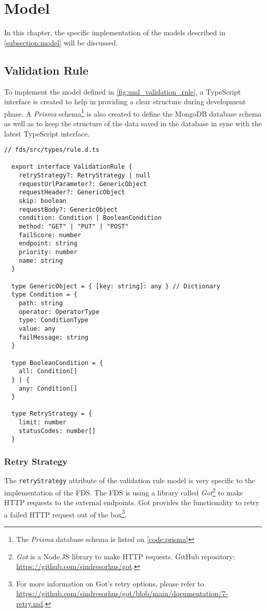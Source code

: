 \section{Model}

In this chapter, the specific implementation of the models described in \autoref{subsection:model} will be discussed. 

  \subsection{Validation Rule}
    To implement the model defined in \autoref{fig:uml_validation_rule}, a TypeScript interface is created to help in providing a clear structure during development phase. A \emph{Prisma} schema\footnote{The \emph{Prisma} database schema is listed on \autoref{code:prisma}} is also created to define the MongoDB database schema as well as to keep the structure of the data saved in the database in sync with the latest TypeScript interface. 

    \begin{lstlisting}[style=es6, caption={TypeScript interface of a validation rule (TypeScript)}]
  // fds/src/types/rule.d.ts
  
  export interface ValidationRule {
    retryStrategy?: RetryStrategy | null
    requestUrlParameter?: GenericObject
    requestHeader?: GenericObject
    skip: boolean
    requestBody?: GenericObject
    condition: Condition | BooleanCondition
    method: "GET" | "PUT" | "POST" 
    failScore: number
    endpoint: string
    priority: number
    name: string
  }
  
  type GenericObject = { [key: string]: any } // Dictionary
  type Condition = {
    path: string
    operator: OperatorType
    type: ConditionType
    value: any
    failMessage: string
  }

  type BooleanCondition = {
    all: Condition[]
  } | {
    any: Condition[]
  }

  type RetryStrategy = {
    limit: number
    statusCodes: number[] 
  }
    \end{lstlisting}
 
    \subsubsection{Retry Strategy}
  The \verb;retryStrategy; attribute of the validation rule model is very specific to the implementation of the FDS. The FDS is using a library called \emph{Got}\footnote{\emph{Got} is a Node.JS library to make HTTP requests. GitHub repository: \url{https://github.com/sindresorhus/got}.} to make HTTP requests to the external endpoints. Got provides the functionality to retry a failed HTTP request out of the box\footnote{For more information on Got's retry options, please refer to \url{https://github.com/sindresorhus/got/blob/main/documentation/7-retry.md}.}.

